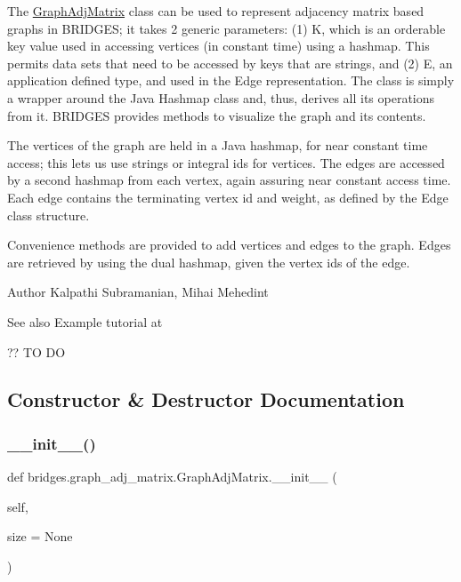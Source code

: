 The \mbox{\hyperlink{classbridges_1_1graph__adj__matrix_1_1_graph_adj_matrix}{Graph\+Adj\+Matrix}} class can be used to represent adjacency matrix based graphs in B\+R\+I\+D\+G\+ES; it takes 2 generic parameters\+: (1) K, which is an orderable key value used in accessing vertices (in constant time) using a hashmap. This permits data sets that need to be accessed by keys that are strings, and (2) E, an application defined type, and used in the Edge representation. The class is simply a wrapper around the Java Hashmap class and, thus, derives all its operations from it. B\+R\+I\+D\+G\+ES provides methods to visualize the graph and its contents.

The vertices of the graph are held in a Java hashmap, for near constant time access; this lets us use strings or integral ids for vertices. The edges are accessed by a second hashmap from each vertex, again assuring near constant access time. Each edge contains the terminating vertex id and weight, as defined by the Edge class structure.

Convenience methods are provided to add vertices and edges to the graph. Edges are retrieved by using the dual hashmap, given the vertex ids of the edge.

\begin{DoxyAuthor}{Author}
Kalpathi Subramanian, Mihai Mehedint
\end{DoxyAuthor}
\begin{DoxySeeAlso}{See also}
Example tutorial at 
\end{DoxySeeAlso}
?? TO DO 

\subsection{Constructor \& Destructor Documentation}
\mbox{\label{classbridges_1_1graph__adj__matrix_1_1_graph_adj_matrix_a2e5870c13b16943415bc5cd163d70171}} 
\subsubsection{\texorpdfstring{\+\_\+\+\_\+init\+\_\+\+\_\+()}{\_\_init\_\_()}}
{\footnotesize\ttfamily def bridges.\+graph\+\_\+adj\+\_\+matrix.\+Graph\+Adj\+Matrix.\+\_\+\+\_\+init\+\_\+\+\_\+ (\begin{DoxyParamCaption}\item[{}]{self,  }\item[{}]{size = {\ttfamily None} }\end{DoxyParamCaption})}



